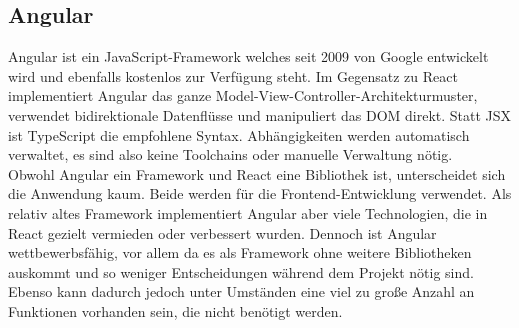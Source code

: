 \subsection{Angular}
Angular ist ein JavaScript-Framework welches seit 2009 von Google entwickelt wird und ebenfalls kostenlos zur Verfügung steht. Im Gegensatz zu React implementiert Angular das ganze Model-View-Controller-Architekturmuster, verwendet bidirektionale Datenflüsse und manipuliert das DOM direkt. Statt JSX ist TypeScript die empfohlene Syntax. Abhängigkeiten werden automatisch verwaltet, es sind also keine Toolchains oder manuelle Verwaltung nötig.\\
Obwohl Angular ein Framework und React eine Bibliothek ist, unterscheidet sich die Anwendung kaum. Beide werden für die Frontend-Entwicklung verwendet. Als relativ altes Framework implementiert Angular aber viele Technologien, die in React gezielt vermieden oder verbessert wurden. Dennoch ist Angular wettbewerbsfähig, vor allem da es als Framework ohne weitere Bibliotheken auskommt und so weniger Entscheidungen während dem Projekt nötig sind. Ebenso kann dadurch jedoch unter Umständen eine viel zu große Anzahl an Funktionen vorhanden sein, die nicht benötigt werden.
